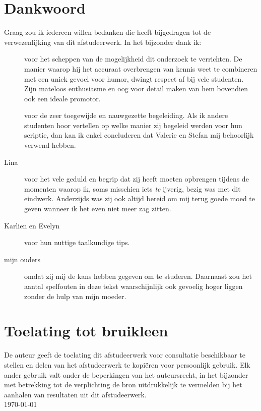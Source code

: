 \newpage
\thispagestyle{plain}

\section*{Dankwoord}
Graag zou ik iedereen willen bedanken die heeft bijgedragen tot de
verwezenlijking van dit afstudeerwerk. In het bijzonder dank ik:
\begin{description}
\item[\promotor] voor het scheppen van de mogelijkheid dit 
onderzoek te verrichten. 
De manier waarop hij het accuraat overbrengen van kennis weet te combineren
met een uniek gevoel voor humor, dwingt respect af bij vele studenten. Zijn 
mateloos enthusiasme en oog voor detail maken van hem bovendien 
ook een ideale promotor.
\item[\begeleider] voor de zeer toegewijde en nauwgezette begeleiding. Als ik andere
studenten hoor vertellen op welke manier zij begeleid werden voor hun scriptie, dan kan 
ik enkel concluderen dat Valerie en Stefan mij behoorlijk verwend hebben.
\item[Lina] voor het vele geduld en begrip dat zij heeft moeten opbrengen tijdens de 
momenten waarop ik, soms misschien iets \emph{te} ijverig, bezig was met dit
eindwerk. Anderzijds was zij ook altijd bereid om mij terug goede moed te geven
wanneer ik het even niet meer zag zitten.
\item[Karlien en Evelyn] voor hun nuttige taalkundige tips.
\item[mijn ouders] omdat zij mij de kans hebben gegeven om te studeren. Daarnaast
zou het aantal spelfouten in deze tekst waarschijnlijk ook gevoelig hoger liggen
zonder de hulp van mijn moeder.
\end{description}
\vfill


\section*{Toelating tot bruikleen}
De auteur geeft de toelating dit afstudeerwerk voor consultatie 
beschikbaar te stellen en delen van het afstudeerwerk te kopi\"eren voor
persoonlijk gebruik. Elk ander gebruik valt onder de beperkingen van het 
auteursrecht, in het bijzonder met betrekking tot de verplichting de bron 
uitdrukkelijk te vermelden bij het aanhalen van resultaten uit dit 
afstudeerwerk.
\\[1cm]
\auteur\hfill \today
\\[1cm]
